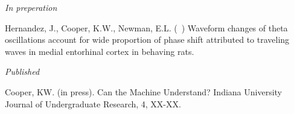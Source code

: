 \begin{cvpubentries}


\iftrue
  \cvpubentry
    {\textit{In preperation}} %
    { } %
    { } %
    { } %
    {
      \begin{cvpubitems} %
        \item {Hernandez,  J.,  Cooper,  K.W.,  Newman,  E.L.  (~)  Waveform  changes  of  theta  oscillations  account  for  wide  proportion  of  phase  shift  attributed  to  traveling  waves  in  medial  entorhinal  cortex  in  behaving  rats. }
      \end{cvpubitems}
    }
\fi

\iffalse
  \cvpubentry
    {\textit{In press}} %
    {} %
    {} %
    {} %
    {
      \begin{cvpubitems} %
        \item {pub}
      \end{cvpubitems}
    }
\fi

  \cvpubentry
    {\textit{Published}} %
    {} %
    {} %
    {} %
    {
      \begin{cvpubitems} %
        \item {Cooper, KW. (in press). Can the Machine Understand? Indiana University Journal of Undergraduate Research, 4, XX-XX.}
      \end{cvpubitems}
    }
\iffalse %
\fi


\end{cvpubentries}
